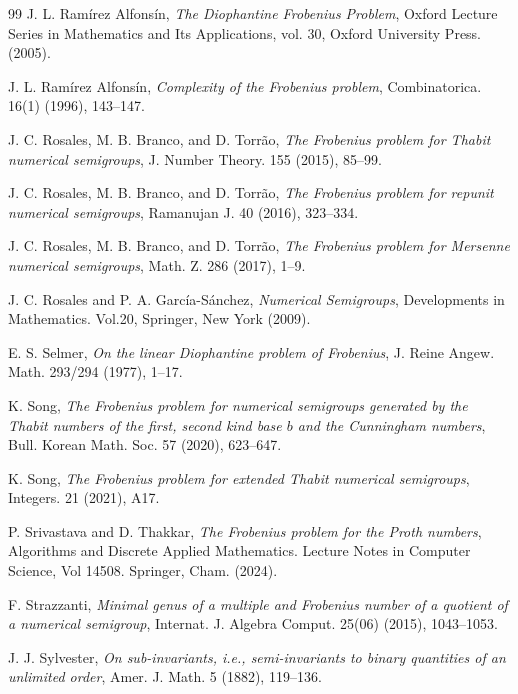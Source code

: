 \documentclass[reqno, 12pt]{article}
\theoremstyle{mydefinition}
\theoremstyle{myremark}
\numberwithin{algorithm}{section}
\begin{document}
\begin{thebibliography}{99}
 J. L. Ram\'irez Alfons\'in, \emph{The Diophantine Frobenius Problem}, Oxford Lecture Series in Mathematics and Its Applications, vol. 30, Oxford University Press. (2005).

 J. L. Ram\'irez Alfons\'in, \emph{Complexity of the Frobenius problem}, Combinatorica. 16(1) (1996), 143--147.

 J. C. Rosales, M. B. Branco, and D. Torr\~ao, \emph{The Frobenius problem for Thabit numerical semigroups}, J. Number Theory. 155 (2015), 85--99.

 J. C. Rosales, M. B. Branco, and D. Torr\~ao, \emph{The Frobenius problem for repunit numerical semigroups},  Ramanujan J. 40 (2016), 323--334.

 J. C. Rosales, M. B. Branco, and D. Torr\~ao, \emph{The Frobenius problem for Mersenne numerical semigroups},  Math. Z. 286 (2017), 1--9.

 J. C. Rosales and P. A. Garc\'ia-S\'anchez, \emph{Numerical Semigroups}, Developments in Mathematics. Vol.20, Springer, New York (2009).

 E. S. Selmer, \emph{On the linear Diophantine problem of Frobenius}, J. Reine Angew. Math. 293/294 (1977), 1--17.

 K. Song, \emph{The Frobenius problem for numerical semigroups generated by the Thabit numbers of the first, second kind base $b$ and the Cunningham numbers}, Bull. Korean Math. Soc. 57 (2020), 623--647.

 K. Song, \emph{The Frobenius problem for extended Thabit numerical semigroups}, Integers. 21 (2021), A17.

 P. Srivastava and D. Thakkar, \emph{The Frobenius problem for the Proth numbers}, Algorithms and Discrete Applied Mathematics. Lecture Notes in Computer Science, Vol 14508. Springer, Cham. (2024).

 F. Strazzanti, \emph{Minimal genus of a multiple and Frobenius number of a quotient of a numerical semigroup}, Internat. J. Algebra Comput. 25(06) (2015), 1043--1053.

 J. J. Sylvester, \emph{On sub-invariants, i.e., semi-invariants to binary quantities of an unlimited order}, Amer. J. Math. 5 (1882), 119--136.
    
\end{thebibliography}
\end{document}
